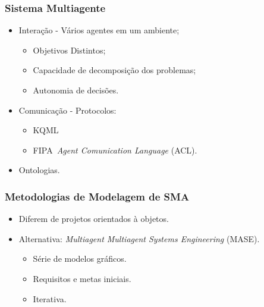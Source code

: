 \documentclass{beamer}
\begin{document}
\begin{frame}
    \frametitle{Sistema Multiagente}

	\begin{itemize}
  		\item Interação - Vários agentes em um ambiente;
		\begin{itemize}
	  		\item Objetivos Distintos;
  			\item Capacidade de decomposição dos problemas;
	  		\item Autonomia de decisões. %
		\end{itemize}
  		\item Comunicação - Protocolos:
		\begin{itemize}
	  		\item KQML
  			\item FIPA~\emph{Agent Comunication Language} (ACL).
		\end{itemize}
	  	\item Ontologias.
	\end{itemize}

\end{frame}


\begin{frame}
    \frametitle{Metodologias de Modelagem de SMA}

	    \begin{itemize}
  		\item Diferem de projetos orientados à objetos.
  		\item Alternativa: \emph{Multiagent Multiagent Systems Engineering} (MASE).
		\begin{itemize}
	  		\item Série de modelos gráficos.
	  		\item Requisitos e metas iniciais.
  			\item Iterativa.
		\end{itemize}
	    \end{itemize}

\end{frame}
\end{document}
